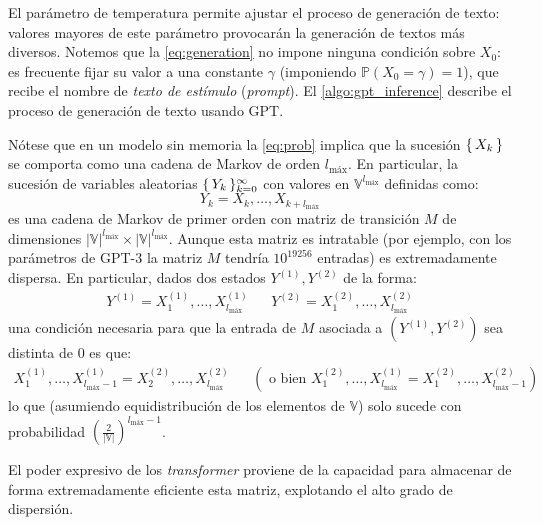 El parámetro de temperatura permite ajustar el proceso de generación de texto: valores mayores de este parámetro provocarán la generación de textos más diversos. Notemos que la \cref{eq:generation} no impone ninguna condición sobre \( X_0 \): es frecuente fijar su valor a una constante \( \gamma \) (imponiendo \( \mathbb{P}(X_0 = \gamma) = 1 \)), que recibe el nombre de \textit{texto de estímulo} (\textit{prompt}). El \cref{algo:gpt_inference} describe el proceso de generación de texto usando GPT.

Nótese que en un modelo sin memoria la \cref{eq:prob} implica que la sucesión \( \{\,X_k\,\} \) se comporta como una cadena de Markov de orden \( l_\text{máx} \). En particular, la sucesión de variables aleatorias \( \{\,Y_k\,\}_{k = 0}^{\infty} \) con valores en \( \mathbb{V}^{l_\text{máx}} \) definidas como:
\[
    Y_k = X_k, …, X_{k + {l_\text{máx}}}
\]
es una cadena de Markov de primer orden con matriz de transición \( M \) de dimensiones \( |\mathbb{V}|^{l_\text{máx}} \times |\mathbb{V}|^{l_\text{máx}} \). Aunque esta matriz es intratable (por ejemplo, con los parámetros de GPT-3 la matriz \( M \) tendría \( 10^{19256} \) entradas) es extremadamente dispersa. En particular, dados dos estados \( Y^{(1)}, Y^{(2)} \) de la forma:
\begin{align*}
    Y^{(1)} = X_1^{(1)}, …, X_{l_\text{máx}}^{(1)} &&
    Y^{(2)} = X_1^{(2)}, …, X_{l_\text{máx}}^{(2)}
\end{align*}
una condición necesaria para que la entrada de \( M \) asociada a \( (Y^{(1)},  Y^{(2)}) \) sea distinta de \( 0 \) es que:
\begin{align*}
    X_1^{(1)}, …, X_{l_\text{máx} - 1}^{(1)} = X_2^{(2)}, …, X_{l_\text{máx}}^{(2)} && \left(\text{ o bien } X_1^{(2)}, …, X_{l_\text{máx}}^{(1)} = X_1^{(2)}, …, X_{l_\text{máx} - 1}^{(2)} \right)
\end{align*}
lo que (asumiendo equidistribución de los elementos de \( \mathbb{V} \)) solo sucede con probabilidad \( \left( \frac{2}{|\mathbb{V}|} \right)^{l_\text{máx} - 1} \).

El poder expresivo de los \textit{transformer} proviene de la capacidad para almacenar de forma extremadamente eficiente esta matriz, explotando el alto grado de dispersión. 